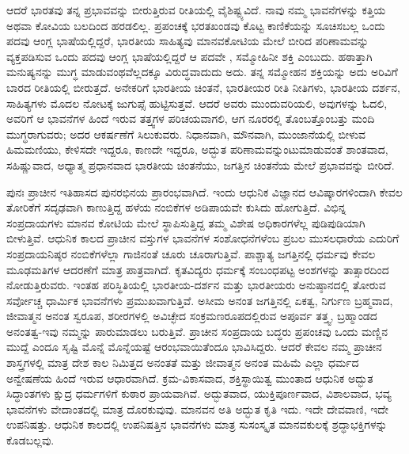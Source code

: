 ಆದರೆ ಭಾರತವು ತನ್ನ ಪ್ರಭಾವವನ್ನು ಬೀರುತ್ತಿರುವ ರೀತಿಯಲ್ಲಿ ವೈಶಿಷ್ಟ್ಯವಿದೆ. ನಾವು ನಮ್ಮ ಭಾವನೆಗಳನ್ನು ಕತ್ತಿಯ ಅಥವಾ ಕೋವಿಯ ಬಲದಿಂದ ಹರಡಲಿಲ್ಲ. ಪ್ರಪಂಚಕ್ಕೆ ಭರತಖಂಡವು ಕೊಟ್ಟ ಕಾಣಿಕೆಯನ್ನು ಸೂಚಿಸಬಲ್ಲ ಒಂದು ಪದವು ಆಂಗ್ಲ ಭಾಷೆಯಲ್ಲಿದ್ದರೆ, ಭಾರತೀಯ ಸಾಹಿತ್ಯವು ಮಾನವಕೋಟಿಯ ಮೇಲೆ ಬೀರಿದ ಪರಿಣಾಮವನ್ನು ವ್ಯಕ್ತಪಡಿಸುವ ಒಂದು ಪದವು ಆಂಗ್ಲ ಭಾಷೆಯಲ್ಲಿದ್ದರೆ ಆ ಪದವೇ , ಸಮ್ಮೋಹಿನೀ ಶಕ್ತಿ ಎಂಬುದು. ಹಠಾತ್ತಾಗಿ ಮನುಷ್ಯನನ್ನು ಮುಗ್ಧ ಮಾಡುವಂಥವೆಲ್ಲದಕ್ಕೂ ವಿರುದ್ಧವಾದುದು ಅದು. ತನ್ನ ಸಮ್ಮೋಹನ ಶಕ್ತಿಯನ್ನು ಅದು ಅರಿವಿಗೆ ಬಾರದ ರೀತಿಯಲ್ಲಿ ಬೀರುತ್ತದೆ. ಅನೇಕರಿಗೆ ಭಾರತೀಯ ಚಿಂತನೆ, ಭಾರತೀಯರ ರೀತಿ ನೀತಿಗಳು, ಭಾರತೀಯ ದರ್ಶನ, ಸಾಹಿತ್ಯಗಳು ಮೊದಲ ನೋಟಕ್ಕೆ ಜುಗುಪ್ಸೆ ಹುಟ್ಟಿಸುತ್ತವೆ. ಆದರೆ ಅವರು ಮುಂದುವರಿಯಲಿ, ಅವುಗಳನ್ನು ಓದಲಿ, ಅವರಿಗೆ ಆ ಭಾವನೆಗಳ ಹಿಂದೆ ಇರುವ ತತ್ತ್ವಗಳ ಪರಿಚಯವಾಗಲಿ, ಆಗ ನೂರರಲ್ಲಿ ತೊಂಬತ್ತೊಂಬತ್ತು ಮಂದಿ ಮುಗ್ಧರಾಗುವರು; ಅದರ ಆಕರ್ಷಣೆಗೆ ಸಿಲುಕುವರು. ನಿಧಾನವಾಗಿ, ಮೌನವಾಗಿ, ಮುಂಜಾನೆಯಲ್ಲಿ ಬೀಳುವ ಹಿಮಮಣಿಯು, ಕೇಳಿಸದೇ ಇದ್ದರೂ, ಕಾಣದೇ ಇದ್ದರೂ, ಅದ್ಭುತ ಪರಿಣಾಮವನ್ನುಂಟುಮಾಡುವಂತೆ ಶಾಂತವಾದ, ಸಹಿಷ್ಣುವಾದ, ಅಧ್ಯಾತ್ಮ ಪ್ರಧಾನವಾದ ಭಾರತೀಯ ಚಿಂತನೆಯು, ಜಗತ್ತಿನ ಚಿಂತನೆಯ ಮೇಲೆ ಪ್ರಭಾವವನ್ನು ಬೀರಿದೆ.

ಪುನಃ ಪ್ರಾಚೀನ ಇತಿಹಾಸದ ಪುನರಭಿನಯ ಪ್ರಾರಂಭವಾಗಿದೆ. ಇಂದು ಆಧುನಿಕ ವಿಜ್ಞಾನದ ಆವಿಷ್ಕಾರಗಳಿಂದಾಗಿ ಕೇವಲ ತೋರಿಕೆಗೆ ಸದೃಢವಾಗಿ ಕಾಣುತ್ತಿದ್ದ ಹಳೆಯ ನಂಬಿಕೆಗಳ ಅಡಿಪಾಯವೇ ಕುಸಿದು ಹೋಗುತ್ತಿದೆ. ವಿಭಿನ್ನ ಸಂಪ್ರದಾಯಗಳು ಮಾನವ ಕೋಟಿಯ ಮೇಲೆ ಸ್ಥಾಪಿಸುತ್ತಿದ್ದ ತಮ್ಮ ವಿಶೇಷ ಅಧಿಕಾರಗಳೆಲ್ಲ ಪುಡಿಪುಡಿಯಾಗಿ ಬೀಳುತ್ತಿವೆ. ಆಧುನಿಕ ಕಾಲದ ಪ್ರಾಚೀನ ವಸ್ತುಗಳ ಭಾವನೆಗಳ ಸಂಶೋಧನೆಗಳೆಂಬ ಪ್ರಬಲ ಮುಸಲಧಾರೆಯ ಎದುರಿಗೆ ಸಂಪ್ರದಾಯನಿಷ್ಠರ ನಂಬಿಕೆಗಳೆಲ್ಲಾ ಗಾಜಿನಂತೆ ಚೂರು ಚೂರಾಗುತ್ತಿವೆ. ಪಾಶ್ಚಾತ್ಯ ಜಗತ್ತಿನಲ್ಲಿ ಧರ್ಮವು ಕೇವಲ ಮೂಢಮತಿಗಳ ಆದರಣೆಗೆ ಮಾತ್ರ ಪಾತ್ರವಾಗಿದೆ. ಕೃತವಿದ್ಯರು ಧರ್ಮಕ್ಕೆ ಸಂಬಂಧಪಟ್ಟ ಅಂಶಗಳನ್ನು ತಾತ್ಸಾರದಿಂದ ನೋಡುತ್ತಿರುವರು. ಇಂತಹ ಪರಿಸ್ಥಿತಿಯಲ್ಲಿ ಭಾರತೀಯ-ದರ್ಶನ ಮತ್ತು ಭಾರತೀಯರು ಅನುಷ್ಠಾನದಲ್ಲಿ ತೋರುವ ಸರ್ವೋಚ್ಚ ಧಾರ್ಮಿಕ ಭಾವನೆಗಳು ಪ್ರಮುಖವಾಗುತ್ತಿವೆ. ಅಸೀಮ ಅನಂತ ಜಗತ್ತಿನಲ್ಲಿ ಏಕತ್ವ, ನಿರ್ಗುಣ ಬ್ರಹ್ಮವಾದ, ಜೀವಾತ್ಮನ ಅನಂತ ಸ್ವರೂಪ, ಶರೀರಗಳಲ್ಲಿ ಅವಿಚ್ಛೇದ ಸಂಕ್ರಮಣರೂಪದಲ್ಲಿರುವ ಅಪೂರ್ವ ತತ್ತ್ವ, ಬ್ರಹ್ಮಾಂಡದ ಅನಂತತ್ವ-ಇವು ನಮ್ಮನ್ನು ಪಾರುಮಾಡಲು ಬರುತ್ತಿವೆ. ಪ್ರಾಚೀನ ಸಂಪ್ರದಾಯ ಬದ್ಧರು ಪ್ರಪಂಚವು ಒಂದು ಮಣ್ಣಿನ ಮುದ್ದೆ ಎಂದೂ ಸೃಷ್ಟಿ ಮೊನ್ನೆ ಮೊನ್ನೆಯಷ್ಟೆ ಆರಂಭವಾಯಿತೆಂದೂ ಭಾವಿಸಿದ್ದರು. ಆದರೆ ಕೇವಲ ನಮ್ಮ ಪ್ರಾಚೀನ ಶಾಸ್ತ್ರಗಳಲ್ಲಿ ಮಾತ್ರ ದೇಶ ಕಾಲ ನಿಮಿತ್ತದ ಅನಂತತೆ ಮತ್ತು ಜೀವಾತ್ಮನ ಅನಂತ ಮಹಿಮೆ ಎಲ್ಲಾ ಧರ್ಮದ ಅನ್ವೇಷಣೆಯ ಹಿಂದೆ ಇರುವ ಆಧಾರವಾಗಿದೆ. ಕ್ರಮ-ವಿಕಾಸವಾದ, ಶಕ್ತಿಸ್ಥಾಯಿತ್ವ  ಮುಂತಾದ ಆಧುನಿಕ ಅದ್ಭುತ ಸಿದ್ಧಾಂತಗಳು ಕ್ಷುದ್ರ ಧರ್ಮಗಳಿಗೆ ಕುಠಾರ ಪ್ರಾಯವಾಗಿವೆ. ಅದ್ಭುತವಾದ, ಯುಕ್ತಿಪೂರ್ಣವಾದ, ವಿಶಾಲವಾದ, ಭವ್ಯ ಭಾವನೆಗಳು ವೇದಾಂತದಲ್ಲಿ ಮಾತ್ರ ದೊರಕುವುವು. ಮಾನವನ ಅತಿ ಅದ್ಭುತ ಕೃತಿ ಇದು. ಇದೇ ದೇವವಾಣಿ, ಇದೇ ಉಪನಿಷತ್ತು. ಆಧುನಿಕ ಕಾಲದಲ್ಲಿ ಉಪನಿಷತ್ತಿನ ಭಾವನೆಗಳು ಮಾತ್ರ ಸುಸಂಸ್ಕೃತ ಮಾನವಕುಲಕ್ಕೆ ಶ್ರದ್ಧಾಭಕ್ತಿಗಳನ್ನು ಕೊಡಬಲ್ಲವು.

